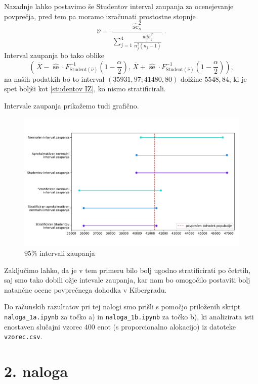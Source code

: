 \documentclass[a4paper,11pt]{article}
\newcommand{\olsi}[1]{\,\overline{\!{#1}}} %
\newcommand{\inv}{^{-1}}
\DeclareMathOperator{\se}{se}
\begin{document}
Nazadnje lahko postavimo še Studentov interval zaupanja za ocenejevanje povprečja, pred tem pa moramo izračunati prostostne stopnje
\[
    \hat{\nu} = \frac{\hat{\se}^2_s}{\sum_{j = 1}^4 \frac{w_j^4 \hat{\sigma}^2_j}{n_j^2 (n_j - 1)}}.  
\]
Interval zaupanja bo tako oblike
\[
    \left(\olsi{X} - \hat{\se} \cdot F_{\text{Student}(\hat{\nu})}\inv\left(1 - \frac{\alpha}{2}\right), 
    \olsi{X} + \hat{\se} \cdot F_{\text{Student}(\hat{\nu})}\inv\left(1 - \frac{\alpha}{2}\right)\right),  
\]
na naših podatkih bo to interval $\left(35931,97; 41480,80\right)$ dolžine $5548,84$, ki je spet boljši kot \eqref{studentov IZ}, ko nismo stratificirali.

Intervale zaupanja prikažemo tudi grafično.
\begin{figure}[h]
    \centering
    \includegraphics[width=\textwidth]{intervali_zaupanja.pdf}
    \caption{$95\%$ intervali zaupanja}
\end{figure}

Zaključimo lahko, da je v tem primeru bilo bolj ugodno stratificirati po četrtih, saj smo tako dobili ožje intevale zaupanja, kar nam bo omogočilo postaviti bolj natančne ocene povprečnega dohodka v Kibergradu. 

Do računskih razultatov pri tej nalogi smo prišli s pomočjo priloženih skript \texttt{naloga\_1a.ipynb} za točko a) in \texttt{naloga\_1b.ipynb} za točko b), ki analizirata isti enostaven slučajni vzorec $400$ enot (s proporcionalno alokacijo) iz datoteke \texttt{vzorec.csv}.

\section*{2. naloga}
\end{document}
